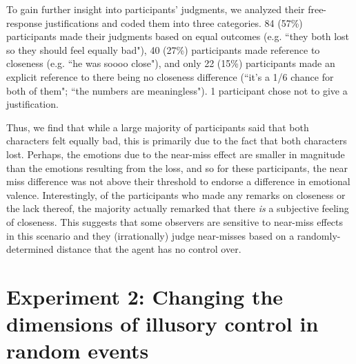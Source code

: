 \documentclass[10pt,letterpaper]{article}
\newcommand{\red}[1]{\textcolor{Red}{#1}}
\begin{document}
To gain further insight into participants' judgments, we analyzed their free-response justifications and coded them into three categories. 84 (57\%) participants made their judgments based on equal outcomes (e.g. ``they both lost so they should feel equally bad"), 40 (27\%) participants made reference to closeness (e.g. ``he was soooo close"), and only 22 (15\%) participants made an explicit reference to there being no closeness difference (``it's a 1/6 chance for both of them"; ``the numbers are meaningless"). 1 participant chose not to give a justification. 

Thus, we find that while a large majority of participants said that both characters felt equally bad, this is primarily due to the fact that both characters lost. Perhaps, the emotions due to the near-miss effect are smaller in magnitude than the emotions resulting from the loss, and so for these participants, the near miss difference was not above their threshold to endorse a difference in emotional valence. Interestingly, of the participants who made any remarks on closeness or the lack thereof, the majority actually remarked that there \textit{is} a subjective feeling of closeness. This suggests that some observers are sensitive to near-miss effects in this scenario and they (irrationally) judge near-misses based on a randomly-determined distance that the agent has no control over.









\section{Experiment 2: Changing the dimensions of illusory control in random events}
\end{document}
